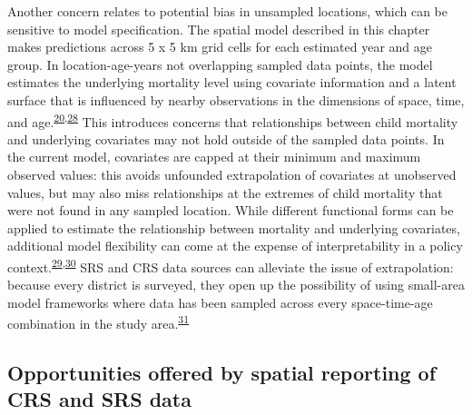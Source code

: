 \documentclass[
]{article}
\begin{document}
Another concern relates to potential bias in unsampled locations, which can be sensitive to model specification. The spatial model described in this chapter makes predictions across 5 x 5 km grid cells for each estimated year and age group. In location-age-years not overlapping sampled data points, the model estimates the underlying mortality level using covariate information and a latent surface that is influenced by nearby observations in the dimensions of space, time, and age.\textsuperscript{\protect\hyperlink{ref-Burstein2019}{20},\protect\hyperlink{ref-Diggle2016}{28}} This introduces concerns that relationships between child mortality and underlying covariates may not hold outside of the sampled data points. In the current model, covariates are capped at their minimum and maximum observed values: this avoids unfounded extrapolation of covariates at unobserved values, but may also miss relationships at the extremes of child mortality that were not found in any sampled location. While different functional forms can be applied to estimate the relationship between mortality and underlying covariates, additional model flexibility can come at the expense of interpretability in a policy context.\textsuperscript{\protect\hyperlink{ref-Pletcher1999}{29},\protect\hyperlink{ref-Lucas2020a}{30}} SRS and CRS data sources can alleviate the issue of extrapolation: because every district is surveyed, they open up the possibility of using small-area model frameworks where data has been sampled across every space-time-age combination in the study area.\textsuperscript{\protect\hyperlink{ref-Wakefield2020}{31}}

\hypertarget{opportunities-offered-by-spatial-reporting-of-crs-and-srs-data}{%
\subsection{Opportunities offered by spatial reporting of CRS and SRS data}\label{opportunities-offered-by-spatial-reporting-of-crs-and-srs-data}}
\end{document}
